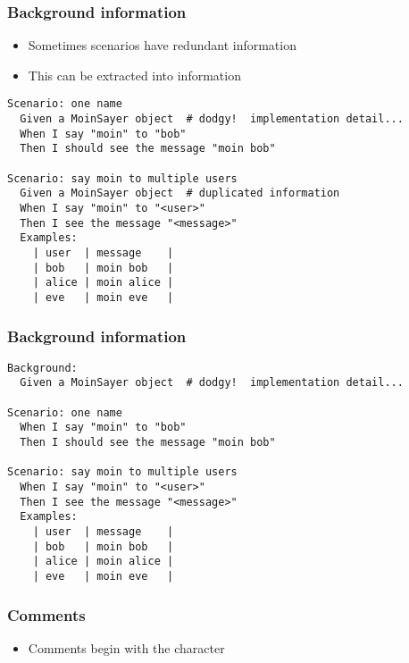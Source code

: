 \documentclass[10pt]{vcs_beamer}
\begin{document}
\begin{frame}[fragile]
\frametitle{Background information}

\begin{itemize}
    \item Sometimes scenarios have redundant information
    \item This can be extracted into  information
\end{itemize}

\begin{lstlisting}
Scenario: one name
  Given a MoinSayer object  # dodgy!  implementation detail...
  When I say "moin" to "bob"
  Then I should see the message "moin bob"

Scenario: say moin to multiple users
  Given a MoinSayer object  # duplicated information
  When I say "moin" to "<user>"
  Then I see the message "<message>"
  Examples:
    | user  | message    |
    | bob   | moin bob   |
    | alice | moin alice |
    | eve   | moin eve   |
\end{lstlisting}

\end{frame}

\begin{frame}[fragile]
\frametitle{Background information}

\begin{lstlisting}
Background:
  Given a MoinSayer object  # dodgy!  implementation detail...

Scenario: one name
  When I say "moin" to "bob"
  Then I should see the message "moin bob"

Scenario: say moin to multiple users
  When I say "moin" to "<user>"
  Then I see the message "<message>"
  Examples:
    | user  | message    |
    | bob   | moin bob   |
    | alice | moin alice |
    | eve   | moin eve   |
\end{lstlisting}

\end{frame}

\begin{frame}[fragile]
    \frametitle{Comments}

    \begin{itemize}
        \item Comments begin with the \ttt{\#} character
    \end{itemize}
\end{frame}
\end{document}
